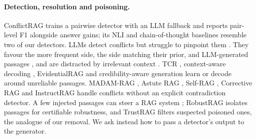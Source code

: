 \paragraph{Detection, resolution and poisoning.}
ConflictRAG \citep{wang2026conflictrag} trains a pairwise detector with an LLM fallback and reports pair-level F1
alongside answer gains; its NLI and chain-of-thought baselines resemble two of our detectors. LLMs detect conflicts but struggle to pinpoint them
\citep{gokul2025contradiction,wang2024resolving,jiayang2024econ}. They favour the more frequent side, the side matching
their prior, and LLM-generated passages \citep{jin2024tugofwar,kortukov2024realistic,tan2024blinded}, and are
distracted by irrelevant context \citep{shi2023distracted,schuster2026whose}. TCR \citep{ye2026tcr}, context-aware
decoding \citep{shi2024cad}, EvidentialRAG \citep{hossain2026evidentialrag} and credibility-aware generation
\citep{pan2024credibility} learn or decode around unreliable passages. MADAM-RAG \citep{wang2025madam}, Astute RAG
\citep{wang2025astute}, Self-RAG \citep{asai2024selfrag}, Corrective RAG \citep{yan2024crag} and InstructRAG
\citep{wei2025instructrag} handle conflicts without an explicit contradiction detector. A few injected passages can steer a RAG
system \citep{zou2025poisonedrag}; RobustRAG \citep{xiang2024robustrag} isolates passages for certifiable robustness,
and TrustRAG \citep{zhou2025trustrag} filters suspected poisoned ones, the analogue of our removal. We ask instead how
to pass a detector's output to the generator.
